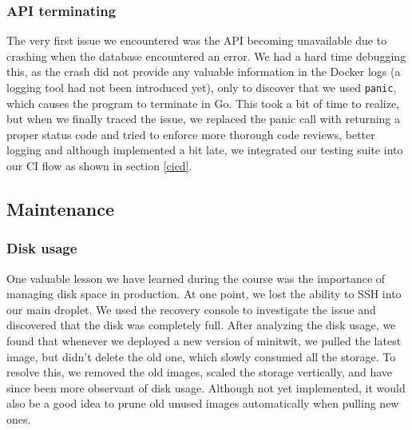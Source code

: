 \subsubsection{API terminating}
The very first issue we encountered was the API becoming unavailable due to crashing when the database encountered an error. We had a hard time debugging this, as the crash did not provide any valuable information in the Docker logs (a logging tool had not been introduced yet), only to discover that we used \texttt{panic}, which causes the program to terminate in Go. This took a bit of time to realize, but when we finally traced the issue, we replaced the panic call with returning a proper status code and tried to enforce more thorough code reviews, better logging and although implemented a bit late, we integrated our testing suite into our CI flow as shown in section \ref{cicd}.

\subsection{Maintenance}\label{maintainence}
\subsubsection{Disk usage}
One valuable lesson we have learned during the course was the importance of managing disk space in production. At one point, we lost the ability to SSH into our main droplet. We used the recovery console to investigate the issue and discovered that the disk was completely full. After analyzing the disk usage, we found that whenever we deployed a new version of minitwit, we pulled the latest image, but didn't delete the old one, which slowly consumed all the storage. To resolve this, we removed the old images, scaled the storage vertically, and have since been more observant of disk usage. Although not yet implemented, it would also be a good idea to prune old unused images automatically when pulling new ones.